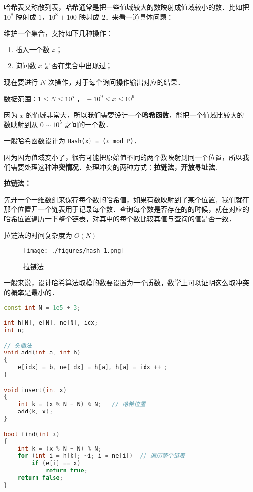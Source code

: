 
哈希表又称散列表，哈希通常是把一些值域较大的数映射成值域较小的数．比如把 $10^8$ 映射成 $1$，$10^8 + 100$ 映射成 $2$．来看一道具体问题：

维护一个集合，支持如下几种操作：

\begin{enumerate}
\item 插入一个数 $x$；

\item 询问数 $x$ 是否在集合中出现过；

\end{enumerate}
现在要进行 $N$ 次操作，对于每个询问操作输出对应的结果．

数据范围：$ 1 \le N \le 10^5$ ，$\ -10^9 \le x \le 10^9$

因为 $x$ 的值域非常大，所以我们需要设计一个\textbf{哈希函数}，能把一个值域比较大的数映射到从 $0 \sim 10^5$ 之间的一个数．

一般哈希函数设计为 \verb|Hash(x) = (x mod P)|．

因为因为值域变小了，很有可能把原始值不同的两个数映射到同一个位置，所以我们需要处理这种\textbf{冲突情况}．处理冲突的两种方式：\textbf{拉链法}，\textbf{开放寻址法}．

\textbf{拉链法：}

先开一个一维数组来保存每个数的哈希值，如果有数映射到了某个位置，我们就在那个位置开一个链表用于记录每个数．查询每个数是否存在的的时候，就在对应的哈希位置遍历一下整个链表，对其中的每个数比较其值与查询的值是否一致．

拉链法的时间复杂度为 $O(N)$
\begin{figure}[ht]
\centering
\texttt{[image: ./figures/hash\_1.png]}
\caption{拉链法} \label{hash_fig1}
\end{figure}

一般来说，设计哈希算法取模的数要设置为一个质数，数学上可以证明这么取冲突的概率是最小的．
\begin{lstlisting}[language=cpp]
const int N = 1e5 + 3;

int h[N], e[N], ne[N], idx;
int n;

// 头插法
void add(int a, int b)
{
    e[idx] = b, ne[idx] = h[a], h[a] = idx ++ ;
}

void insert(int x)
{
    int k = (x % N + N) % N;   // 哈希位置
    add(k, x);
}

bool find(int x)
{
    int k = (x % N + N) % N;
    for (int i = h[k]; ~i; i = ne[i])  // 遍历整个链表
        if (e[i] == x)
            return true;
    return false;
}
\end{lstlisting}


